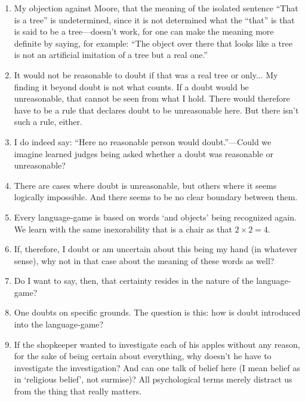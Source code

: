 \documentclass{book}
\begin{document}
\begin{enumerate}
\item
My objection against Moore, that the meaning of the isolated sentence ``That is
a tree'' is undetermined, since it is not determined what the ``that'' is that
is said to be a tree---doesn't work, for one can make the meaning more definite
by saying, for example: ``The object over there that looks like a tree is not
an artificial imitation of a tree but a real one.''

\item
It would not be reasonable to doubt if that was a real tree or only...  My
finding it beyond doubt is not what counts. If a doubt would be unreasonable,
that cannot be seen from what I hold. There would therefore have to be a rule
that declares doubt to be unreasonable here. But there isn't such a rule,
either.

\item
I do indeed say: ``Here no reasonable person would doubt.''---Could we imagine
learned judges being asked whether a doubt was reasonable or unreasonable?

\item
There are cases where doubt is unreasonable, but others where it seems
logically impossible. And there seems to be no clear boundary between them.

\item
Every language-game is based on words `and objects' being recognized again. We
learn with the same inexorability that is a chair as that $2{\times}2=4$.

\item
If, therefore, I doubt or am uncertain about this being my hand (in whatever
sense), why not in that case about the meaning of these words as well?

\item
Do I want to say, then, that certainty resides in the nature of the
language-game?

\item
One doubts on specific grounds. The question is this: how is doubt introduced
into the language-game?

\item
If the shopkeeper wanted to investigate each of his apples without any reason,
for the sake of being certain about everything, why doesn't he have to
investigate the investigation? And can one talk of belief here (I mean belief
as in `religious belief', not surmise)? All psychological terms merely distract
us from the thing that really matters.


\end{enumerate}
\end{document}
